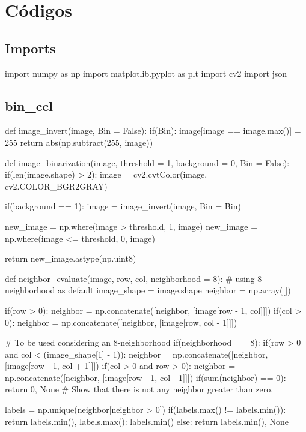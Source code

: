 \documentclass{article}
\begin{document}
\section{Códigos}

\subsection{Imports}
\label{cod:imports}
\begin{python}
	import numpy as np
	import matplotlib.pyplot as plt
	import cv2
	import json
\end{python}

\subsection{bin\_ccl}
\label{cod:ccl}
\begin{python}
def image_invert(image, Bin = False):
	if(Bin):
		image[image == image.max()] = 255
	return abs(np.subtract(255, image))

def image_binarization(image, threshold = 1, 	background = 0, Bin = False):  
	if(len(image.shape) > 2):
		image = cv2.cvtColor(image, cv2.COLOR_BGR2GRAY)
	
	if(background == 1):
		image = image_invert(image, Bin = Bin)
	
	new_image = np.where(image > threshold, 1, image)
	new_image = np.where(image <= threshold, 0, image)
	
	return new_image.astype(np.uint8)

def neighbor_evaluate(image, row, col, neighborhood = 8):
	# using 8-neighborhood as default
	image_shape = image.shape
	neighbor = np.array([])
	
	if(row > 0):
		neighbor = np.concatenate([neighbor, [image[row - 1, col]]])     
	if(col > 0):
		neighbor = np.concatenate([neighbor, [image[row, col - 1]]])
	
	# To be used considering an 8-neighborhood
	if(neighborhood == 8):
		if(row > 0 and col < (image_shape[1] - 1)):
			neighbor = np.concatenate([neighbor, [image[row - 1, col + 1]]])        
		if(col > 0 and row > 0): 
			neighbor = np.concatenate([neighbor, [image[row - 1, col - 1]]])
	if(sum(neighbor) == 0):
		return 0, None # Show that there is not any neighbor greater than zero.
	
	labels = np.unique(neighbor[neighbor > 0])
	if(labels.max() != labels.min()):
		return labels.min(), {labels.max(): labels.min()}
	else:
		return labels.min(), None



\end{python}
\end{document}
